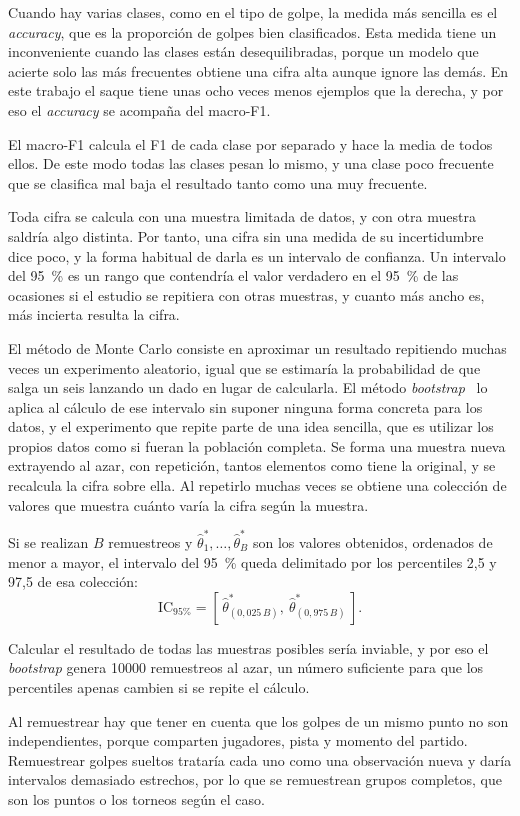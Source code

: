 Cuando hay varias clases, como en el tipo de golpe, la medida más sencilla es el \textit{accuracy}, que es la proporción de golpes bien clasificados.
Esta medida tiene un inconveniente cuando las clases están desequilibradas, porque un modelo que acierte solo las más frecuentes obtiene una cifra alta aunque ignore las demás.
En este trabajo el saque tiene unas ocho veces menos ejemplos que la derecha, y por eso el \textit{accuracy} se acompaña del macro-F1.

El macro-F1 calcula el F1 de cada clase por separado y hace la media de todos ellos.
De este modo todas las clases pesan lo mismo, y una clase poco frecuente que se clasifica mal baja el resultado tanto como una muy frecuente.

Toda cifra se calcula con una muestra limitada de datos, y con otra muestra saldría algo distinta.
Por tanto, una cifra sin una medida de su incertidumbre dice poco, y la forma habitual de darla es un intervalo de confianza.
Un intervalo del 95~\% es un rango que contendría el valor verdadero en el 95~\% de las ocasiones si el estudio se repitiera con otras muestras, y cuanto más ancho es, más incierta resulta la cifra.

El método de Monte Carlo consiste en aproximar un resultado repitiendo muchas veces un experimento aleatorio, igual que se estimaría la probabilidad de que salga un seis lanzando un dado en lugar de calcularla.
El método \textit{bootstrap}~\cite{efron1979bootstrap} lo aplica al cálculo de ese intervalo sin suponer ninguna forma concreta para los datos, y el experimento que repite parte de una idea sencilla, que es utilizar los propios datos como si fueran la población completa.
Se forma una muestra nueva extrayendo al azar, con repetición, tantos elementos como tiene la original, y se recalcula la cifra sobre ella.
Al repetirlo muchas veces se obtiene una colección de valores que muestra cuánto varía la cifra según la muestra.

Si se realizan $B$ remuestreos y $\hat{\theta}^{*}_1, \ldots, \hat{\theta}^{*}_B$ son los valores obtenidos, ordenados de menor a mayor, el intervalo del 95~\% queda delimitado por los percentiles 2,5 y 97,5 de esa colección:
\begin{equation}
  \mathrm{IC}_{95\%} = \left[\, \hat{\theta}^{*}_{(0{,}025\,B)},\ \hat{\theta}^{*}_{(0{,}975\,B)} \,\right].
  \label{eq:bootstrap-ic}
\end{equation}

Calcular el resultado de todas las muestras posibles sería inviable, y por eso el \textit{bootstrap} genera \num{10000} remuestreos al azar, un número suficiente para que los percentiles apenas cambien si se repite el cálculo.

Al remuestrear hay que tener en cuenta que los golpes de un mismo punto no son independientes, porque comparten jugadores, pista y momento del partido.
Remuestrear golpes sueltos trataría cada uno como una observación nueva y daría intervalos demasiado estrechos, por lo que se remuestrean grupos completos, que son los puntos o los torneos según el caso.
